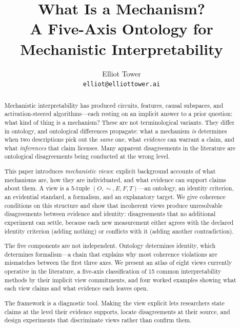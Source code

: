 \documentclass[11pt]{article}
\title{\textbf{What Is a Mechanism?}\\[0.3em]
\large A Five-Axis Ontology for Mechanistic Interpretability}
\author{Elliot Tower\\[0.1em]
\small \texttt{elliot@elliottower.ai}}
\date{}
\theoremstyle{remark}
\begin{document}
\maketitle

\begin{abstract}
Mechanistic interpretability has produced circuits, features, causal
subspaces, and activation-steered algorithms---each resting on an
implicit answer to a prior question: what kind of thing is a mechanism?
These are not terminological variants.  They differ in ontology, and
ontological differences propagate: what a mechanism \emph{is} determines
when two descriptions pick out the \emph{same} one, what \emph{evidence}
can warrant a claim, and what \emph{inferences} that claim licenses.
Many apparent disagreements in the literature are ontological
disagreements being conducted at the wrong level.

This paper introduces \emph{mechanistic views}: explicit background
accounts of what mechanisms are, how they are individuated, and what
evidence can support claims about them.  A view is a 5-tuple
$(O, {\sim}, E, F, T)$---an ontology, an identity criterion, an
evidential standard, a formalism, and an explanatory target.  We give
coherence conditions on this structure and show that incoherent views
produce unresolvable disagreements between evidence and identity:
disagreements that no additional experiment can settle, because each new
measurement either agrees with the declared identity criterion (adding
nothing) or conflicts with it (adding another contradiction).

The five components are not independent.  Ontology determines identity,
which determines formalism---a chain that explains why most coherence
violations are mismatches between the first three axes.  We present an
atlas of eight views currently operative in the literature, a five-axis
classification of 15 common interpretability methods by their implicit
view commitments, and four worked examples showing what each view claims
and what evidence each leaves open.

The framework is a diagnostic tool.  Making the view explicit lets
researchers state claims at the level their evidence supports, locate
disagreements at their source, and design experiments that discriminate
views rather than confirm them.
\end{abstract}

\tableofcontents
\newpage

\end{document}
